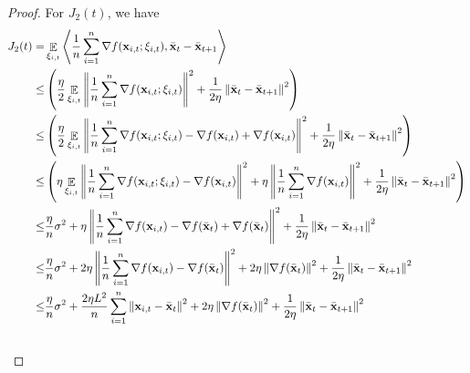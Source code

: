 \documentclass{article}
\begin{document}
\begin{proof}
For $J_2(t)$, we have
\begin{align}
\nonumber
J_2(t) = & \mathop{\mathbb{E}}_{\xi_{i,t}}\left\langle\frac{1}{n}\sum_{i=1}^n\nabla f({\bf x}_{i,t};\xi_{i,t}), \bar{{\bf x}}_t - \bar{{\bf x}}_{t+1}  \right\rangle \\ \nonumber
\le & \left( \frac{\eta}{2}\mathop{\mathbb{E}}_{\xi_{i,t}} \left\lVert\frac{1}{n}\sum_{i=1}^n \nabla f({\bf x}_{i,t};\xi_{i,t})\right\rVert^2 + \frac{1}{2\eta} \left\lVert \bar{{\bf x}}_t - \bar{{\bf x}}_{t+1}\right\rVert^2  \right) \\ \nonumber
\le & \left( \frac{\eta}{2}\mathop{\mathbb{E}}_{\xi_{i,t}}\left\lVert\frac{1}{n}\sum_{i=1}^n\nabla f({\bf x}_{i,t};\xi_{i,t}) - \nabla f({\bf x}_{i,t}) + \nabla f({\bf x}_{i,t})\right\rVert^2 + \frac{1}{2\eta} \left\lVert \bar{{\bf x}}_t - \bar{{\bf x}}_{t+1}\right\rVert^2  \right) \\ \nonumber
\le & \left(  \eta\mathop{\mathbb{E}}_{\xi_{i,t}}\left\lVert\frac{1}{n}\sum_{i=1}^n\nabla f({\bf x}_{i,t};\xi_{i,t}) - \nabla f({\bf x}_{i,t})\right\rVert^2 + \eta \left\lVert\frac{1}{n}\sum_{i=1}^n\nabla f({\bf x}_{i,t})\right\rVert^2 + \frac{1}{2\eta} \left\lVert \bar{{\bf x}}_t - \bar{{\bf x}}_{t+1}\right\rVert^2  \right) \\ \nonumber
\le & \frac{\eta}{n} \sigma^2 + \eta \left\lVert\frac{1}{n}\sum_{i=1}^n\nabla f({\bf x}_{i,t}) - \nabla f(\bar{{\bf x}}_t) + \nabla f(\bar{{\bf x}}_t)\right\rVert^2 + \frac{1}{2\eta} \left\lVert \bar{{\bf x}}_t - \bar{{\bf x}}_{t+1}\right\rVert^2 \\ \nonumber
\le & \frac{\eta}{n} \sigma^2 + 2\eta \left\lVert\frac{1}{n}\sum_{i=1}^n\nabla f({\bf x}_{i,t}) - \nabla f(\bar{{\bf x}}_t) \right\rVert^2 + 2\eta \left\lVert\nabla f(\bar{{\bf x}}_t)\right\rVert^2 + \frac{1}{2\eta} \left\lVert \bar{{\bf x}}_t - \bar{{\bf x}}_{t+1}\right\rVert^2 \\ \nonumber
\le & \frac{\eta}{n} \sigma^2 + \frac{2\eta L^2}{n}\sum_{i=1}^n \left\lVert{\bf x}_{i,t} - \bar{{\bf x}}_t \right\rVert^2 + 2\eta \left\lVert\nabla f(\bar{{\bf x}}_t)\right\rVert^2 + \frac{1}{2\eta} \left\lVert \bar{{\bf x}}_t - \bar{{\bf x}}_{t+1}\right\rVert^2 \\ \nonumber
\end{align} 




\end{proof}
\end{document}
